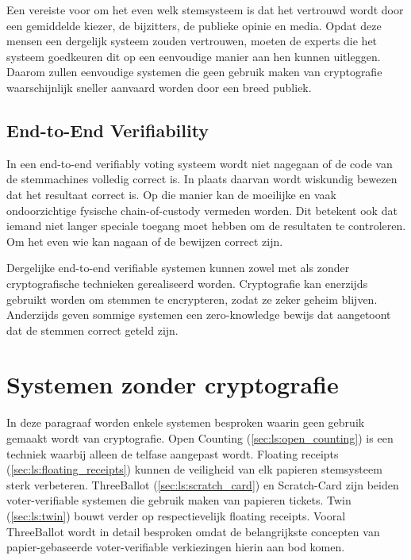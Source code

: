 \npar Een vereiste voor om het even welk stemsysteem is dat het vertrouwd wordt door een gemiddelde kiezer, de bijzitters, de publieke opinie en media. Opdat deze mensen een dergelijk systeem zouden vertrouwen, moeten de experts die het systeem goedkeuren dit op een eenvoudige manier aan hen kunnen uitleggen.\cite{randell_ryan_voting_technologies_and_trust} Daarom zullen eenvoudige systemen die geen gebruik maken van cryptografie waarschijnlijk sneller aanvaard worden door een breed publiek.

\subsection{End-to-End Verifiability}
\label{sec:ls:end_to_end_verifiability}

In een end-to-end verifiably voting systeem wordt niet nagegaan of de code van de stemmachines volledig correct is. In plaats daarvan wordt wiskundig bewezen dat het resultaat correct is. Op die manier kan de moeilijke en vaak ondoorzichtige fysische chain-of-custody vermeden worden. Dit betekent ook dat iemand niet langer speciale toegang moet hebben om de resultaten te controleren. Om het even wie kan nagaan of de bewijzen correct zijn.

\npar Dergelijke end-to-end verifiable systemen kunnen zowel met als zonder cryptografische technieken gerealiseerd worden. Cryptografie kan enerzijds gebruikt worden om stemmen te encrypteren, zodat ze zeker geheim blijven. Anderzijds geven sommige systemen een zero-knowledge bewijs dat aangetoont dat de stemmen correct geteld zijn.

\section{Systemen zonder cryptografie}
\label{sec:ls:systemen_zonder_cryptografie}

In deze paragraaf worden enkele systemen besproken waarin geen gebruik gemaakt wordt van cryptografie. Open Counting (\ref{sec:ls:open_counting}) is een techniek waarbij alleen de telfase aangepast wordt. Floating receipts (\ref{sec:ls:floating_receipts}) kunnen de veiligheid van elk papieren stemsysteem sterk verbeteren. ThreeBallot (\ref{sec:ls:scratch_card}) en Scratch-Card zijn beiden voter-verifiable systemen die gebruik maken van papieren tickets. Twin (\ref{sec:ls:twin}) bouwt verder op respectievelijk floating receipts. Vooral ThreeBallot wordt in detail besproken omdat de belangrijkste concepten van papier-gebaseerde voter-verifiable verkiezingen hierin aan bod komen.

